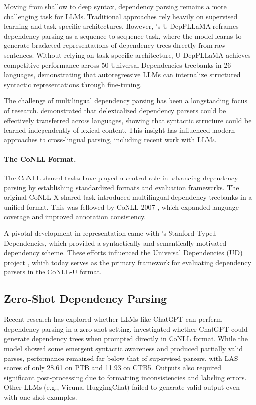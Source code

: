 Moving from shallow to deep syntax, dependency parsing remains a more challenging task for LLMs. Traditional approaches rely heavily on supervised learning and task-specific architectures. However, \citet{hromei2024udeppllama}'s U-DepPLLaMA reframes dependency parsing as a sequence-to-sequence task, where the model learns to generate bracketed representations of dependency trees directly from raw sentences. Without relying on task-specific architecture, U-DepPLLaMA achieves competitive performance across 50 Universal Dependencies treebanks in 26 languages, demonstrating that autoregressive LLMs can internalize structured syntactic representations through fine-tuning.

The challenge of multilingual dependency parsing has been a longstanding focus of research. \citet{mcdonald2011multi} demonstrated that delexicalized dependency parsers could be effectively transferred across languages, showing that syntactic structure could be learned independently of lexical content. This insight has influenced modern approaches to cross-lingual parsing, including recent work with LLMs.

\paragraph{The CoNLL Format.} The CoNLL shared tasks have played a central role in advancing dependency parsing by establishing standardized formats and evaluation frameworks. The original CoNLL-X shared task \citep{buchholz2006conll} introduced multilingual dependency treebanks in a unified format. This was followed by CoNLL 2007 \citep{nivre2007conll}, which expanded language coverage and improved annotation consistency.

A pivotal development in representation came with \citet{de2006generating}'s Stanford Typed Dependencies, which provided a syntactically and semantically motivated dependency scheme. These efforts influenced the Universal Dependencies (UD) project \citep{nivre2016universal}, which today serves as the primary framework for evaluating dependency parsers in the CoNLL-U format.

\subsection{Zero-Shot Dependency Parsing}

Recent research has explored whether LLMs like ChatGPT can perform dependency parsing in a zero-shot setting. \citet{lin2023chatgpt} investigated whether ChatGPT could generate dependency trees when prompted directly in CoNLL format. While the model showed some emergent syntactic awareness and produced partially valid parses, performance remained far below that of supervised parsers, with LAS scores of only 28.61 on PTB and 11.93 on CTB5. Outputs also required significant post-processing due to formatting inconsistencies and labeling errors. Other LLMs (e.g., Vicuna, HuggingChat) failed to generate valid output even with one-shot examples.

